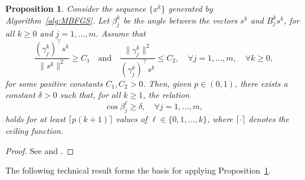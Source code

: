 \documentclass[11pt]{article}
\newtheorem{proposition}[theorem]{Proposition}
\numberwithin{assumption}{section}
\begin{document}
\begin{proposition}\label{l:poa}
Consider the sequence $\{x^k\}$ generated by Algorithm~\ref{alg:MBFGS}.
Let $\beta_j^k$ be the angle between the vectors $s^k$ and $B_j^ks^k$, for all $k\geq 0$ and $j=1,\ldots,m$.
Assume that
$$\dfrac{(\gamma_j^{k})^\top s^k}{\|s^k\|^2}\geq C_1  \quad \mbox{and} \quad \dfrac{\|\gamma_j^{k}\|^2}{(\gamma_j^{k})^\top s^k}\leq C_2,  \quad \forall j=1,\ldots,m, \quad \forall k\geq 0,$$
for some positive constants $C_1,C_2>0$.
Then, given $p\in(0,1)$, there exists a constant $\delta>0$ such that, for all $k \geq 1$, the relation
$$\cos \beta_j^{\ell} \geq \delta, \quad \forall j=1,\ldots,m,$$
holds for at least $\lceil p(k+1) \rceil$ values of $\ell \in \{0,1,\ldots,k\}$, where $\lceil \cdot \rceil$ denotes the ceiling function.
\end{proposition}
\begin{proof}
See  \cite[Theorem~2.1]{Tool} and \cite[Lemma~4.2]{Leandro&Danilo}.
\end{proof}

The following technical result forms the basis for applying Proposition~\ref{l:poa}.
\end{document}
